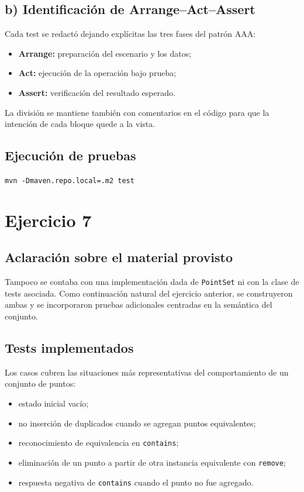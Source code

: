 \documentclass[12pt,a4paper]{article}
\begin{document}
\subsection{b) Identificación de Arrange--Act--Assert}
Cada test se redactó dejando explícitas las tres fases del patrón AAA:
\begin{itemize}
  \item \textbf{Arrange:} preparación del escenario y los datos;
  \item \textbf{Act:} ejecución de la operación bajo prueba;
  \item \textbf{Assert:} verificación del resultado esperado.
\end{itemize}
La división se mantiene también con comentarios en el código para que la intención de cada bloque quede a la vista.

\subsection{Ejecución de pruebas}
\begin{center}
\texttt{mvn -Dmaven.repo.local=.m2 test}
\end{center}

\section{Ejercicio 7}
\subsection{Aclaración sobre el material provisto}
Tampoco se contaba con una implementación dada de \texttt{PointSet} ni con la clase de tests asociada. Como continuación natural del ejercicio anterior, se construyeron ambas y se incorporaron pruebas adicionales centradas en la semántica del conjunto.

\subsection{Tests implementados}
Los casos cubren las situaciones más representativas del comportamiento de un conjunto de puntos:
\begin{itemize}
  \item estado inicial vacío;
  \item no inserción de duplicados cuando se agregan puntos equivalentes;
  \item reconocimiento de equivalencia en \texttt{contains};
  \item eliminación de un punto a partir de otra instancia equivalente con \texttt{remove};
  \item respuesta negativa de \texttt{contains} cuando el punto no fue agregado.
\end{itemize}
\end{document}
